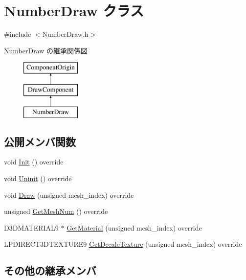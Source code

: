 \hypertarget{class_number_draw}{}\section{Number\+Draw クラス}
\label{class_number_draw}


{\ttfamily \#include $<$Number\+Draw.\+h$>$}

Number\+Draw の継承関係図\begin{figure}[H]
\begin{center}
\leavevmode
\includegraphics[height=3.000000cm]{class_number_draw}
\end{center}
\end{figure}
\subsection*{公開メンバ関数}
\begin{DoxyCompactItemize}
\item 
void \mbox{\hyperlink{class_number_draw_ad52c1e8b9ae6e830a82c440cc18cb6c9}{Init}} () override
\item 
void \mbox{\hyperlink{class_number_draw_a2b203d101f23f0d3f584937ff5ad662a}{Uninit}} () override
\item 
void \mbox{\hyperlink{class_number_draw_a8ff9515eb359a04517d7d36321fff0d7}{Draw}} (unsigned mesh\+\_\+index) override
\item 
unsigned \mbox{\hyperlink{class_number_draw_ace379e39f5646b4d04f3fc9cc1beea1a}{Get\+Mesh\+Num}} () override
\item 
D3\+D\+M\+A\+T\+E\+R\+I\+A\+L9 $\ast$ \mbox{\hyperlink{class_number_draw_a9454f2a7dab2afd1e981c7cf14329659}{Get\+Material}} (unsigned mesh\+\_\+index) override
\item 
L\+P\+D\+I\+R\+E\+C\+T3\+D\+T\+E\+X\+T\+U\+R\+E9 \mbox{\hyperlink{class_number_draw_a4485821e07841a9d0fe33d5a047ed7d0}{Get\+Decale\+Texture}} (unsigned mesh\+\_\+index) override
\end{DoxyCompactItemize}
\subsection*{その他の継承メンバ}


